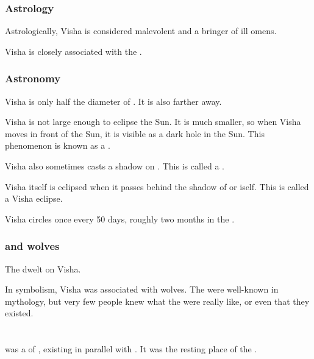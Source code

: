 \subsubsection{Astrology}
Astrologically, Visha is considered malevolent and a bringer of ill omens. 

Visha is closely associated with the . 





\subsubsection{Astronomy}
Visha is only half the diameter of \Dun{}. 
It is also farther away. 

Visha is not large enough to eclipse the Sun. It is much smaller, so when Visha moves in front of the Sun, it is visible as a dark hole in the Sun. This phenomenon is known as a . 

Visha also sometimes casts a shadow on \Dun{}. This is called a . 

Visha itself is eclipsed when it passes behind the shadow of \Dun{} or \Miith{} iself. This is called a Visha eclipse. 

Visha circles \Miith{} once every 50 days, roughly two months in the .





\subsubsection{\Vorcanths{} and wolves}
The  dwelt on Visha. 

In symbolism, Visha was associated with wolves. 
The  were well-known in mythology, but very few people knew what the \vorcanths{} were really like, or even that they existed. 













\section{\Neevrai}
\index{\Neevrai}
\Neevrai was a  of \Miith, existing in parallel with \Azmith. 
It was the resting place of the . 










